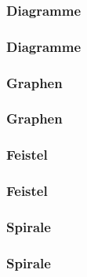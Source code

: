 \begin{frame}
\frametitle{Diagramme}
\begin{figure}[!h]

\end{figure}
\end{frame}

\begin{frame}
\frametitle{Diagramme}
	
\end{frame}

\begin{frame}
\frametitle{Graphen}
\begin{figure}[!h]

\end{figure}
\end{frame}

\begin{frame}
\frametitle{Graphen}
	
\end{frame}

\begin{frame}
\frametitle{Feistel}
\begin{figure}[!h]

\end{figure}
\end{frame}

\begin{frame}
\frametitle{Feistel}
	
\end{frame}

\begin{frame}
\frametitle{Spirale}
\begin{figure}[!h]

\end{figure}
\end{frame}

\begin{frame}
\frametitle{Spirale}
	
\end{frame}

